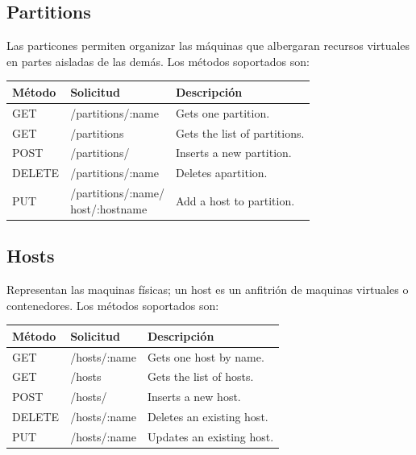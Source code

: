 \documentclass[conference, spanish]{IEEEtran}
\begin{document}
\subsection{Partitions}
Las particones permiten organizar las máquinas que albergaran recursos virtuales en partes aisladas de las demás. Los métodos soportados son:

\begin{center}
 \small
 \begin{tabular}{| l | l | l |}
 \hline
  \textbf{Método} & \textbf{Solicitud} & \textbf{Descripción} \\ [0.5ex] 
  \hline\hline
  GET & /partitions/:name & Gets one partition. \\
  \hline
  GET & /partitions & Gets the list of partitions. \\
  \hline  
  POST & /partitions/ & Inserts a new partition. \\
  \hline
  DELETE & /partitions/:name & Deletes apartition. \\
  \hline  
  PUT & \pbox{5cm}{/partitions/:name/ \\host/:hostname} & Add a host to partition. \\ [1ex] 
  \hline
\end{tabular}
\end{center}

\subsection{Hosts}
Representan las maquinas físicas; un host es un anfitrión de maquinas virtuales o contenedores. Los métodos soportados son:

\begin{center}
 \small
 \begin{tabular}{| l | l | l |}
 \hline
 \textbf{Método} & \textbf{Solicitud} & \textbf{Descripción} \\ [0.5ex] 
  \hline\hline
  GET & /hosts/:name & Gets one host by name. \\
  \hline
  GET & /hosts & Gets the list of hosts. \\
  \hline  
  POST & /hosts/ & Inserts a new host. \\
  \hline
  DELETE & /hosts/:name & Deletes an existing host. \\
  \hline  
  PUT & /hosts/:name & Updates an existing host. \\ [1ex] 
  \hline
\end{tabular}
\end{center}
\end{document}
